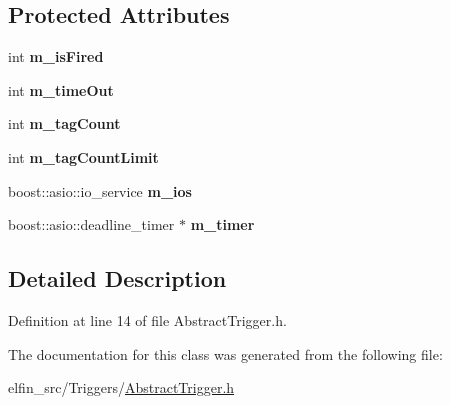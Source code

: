 \subsection*{Protected Attributes}
\begin{DoxyCompactItemize}
\item 
\hypertarget{class_e_l_f_i_n_1_1_abstract_trigger_a90e6454e493094e5295a8d71871f71a7}{int {\bfseries m\-\_\-is\-Fired}}\label{class_e_l_f_i_n_1_1_abstract_trigger_a90e6454e493094e5295a8d71871f71a7}

\item 
\hypertarget{class_e_l_f_i_n_1_1_abstract_trigger_ae13c310832134d6bad0e802ad767b56b}{int {\bfseries m\-\_\-time\-Out}}\label{class_e_l_f_i_n_1_1_abstract_trigger_ae13c310832134d6bad0e802ad767b56b}

\item 
\hypertarget{class_e_l_f_i_n_1_1_abstract_trigger_a9c0feec8187fe38904acd46b860965bf}{int {\bfseries m\-\_\-tag\-Count}}\label{class_e_l_f_i_n_1_1_abstract_trigger_a9c0feec8187fe38904acd46b860965bf}

\item 
\hypertarget{class_e_l_f_i_n_1_1_abstract_trigger_aa1403adec2d6ca774838148f7bf19be3}{int {\bfseries m\-\_\-tag\-Count\-Limit}}\label{class_e_l_f_i_n_1_1_abstract_trigger_aa1403adec2d6ca774838148f7bf19be3}

\item 
\hypertarget{class_e_l_f_i_n_1_1_abstract_trigger_a1ef218ddb60371959e0bcf1f315ef6d6}{boost\-::asio\-::io\-\_\-service {\bfseries m\-\_\-ios}}\label{class_e_l_f_i_n_1_1_abstract_trigger_a1ef218ddb60371959e0bcf1f315ef6d6}

\item 
\hypertarget{class_e_l_f_i_n_1_1_abstract_trigger_a85be320c6b145a89a188647809a24f77}{boost\-::asio\-::deadline\-\_\-timer $\ast$ {\bfseries m\-\_\-timer}}\label{class_e_l_f_i_n_1_1_abstract_trigger_a85be320c6b145a89a188647809a24f77}

\end{DoxyCompactItemize}


\subsection{Detailed Description}


Definition at line 14 of file Abstract\-Trigger.\-h.



The documentation for this class was generated from the following file\-:\begin{DoxyCompactItemize}
\item 
elfin\-\_\-src/\-Triggers/\hyperlink{_abstract_trigger_8h}{Abstract\-Trigger.\-h}\end{DoxyCompactItemize}
